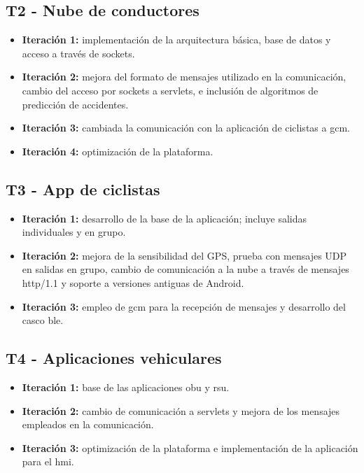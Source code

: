 \subsection{T2 - Nube de conductores}
\begin{itemize}
	\item \textbf{Iteración 1:} implementación de la arquitectura básica, base de
	datos y acceso a través de sockets.

	\item \textbf{Iteración 2:} mejora del formato de mensajes utilizado en la
	comunicación, cambio del acceso por	sockets a servlets, e inclusión de
	algoritmos de predicción de accidentes.

	\item \textbf{Iteración 3:} cambiada la comunicación con la aplicación de
	ciclistas a \gls{gcm}.

	\item \textbf{Iteración 4:} optimización de la plataforma.
\end{itemize}

\subsection{T3 - App de ciclistas}
\begin{itemize}
	\item \textbf{Iteración 1:} desarrollo de la base de la aplicación; incluye
	salidas individuales y en grupo.

	\item \textbf{Iteración 2:} mejora de la sensibilidad del GPS, prueba con
	mensajes UDP en salidas en grupo, cambio de comunicación a la nube a través
	de mensajes \Gls{http/1.1} y soporte a versiones antiguas de Android.

	\item \textbf{Iteración 3:} empleo de \gls{gcm} para la recepción de mensajes
	y desarrollo del casco \gls{ble}.
\end{itemize}

\subsection{T4 - Aplicaciones vehiculares}
\begin{itemize}
	\item \textbf{Iteración 1:} base de las aplicaciones \gls{obu} y \gls{rsu}.

	\item \textbf{Iteración 2:} cambio de comunicación a servlets y mejora de
	los mensajes empleados en la comunicación.

	\item \textbf{Iteración 3:} optimización de la plataforma e implementación
	de la aplicación para el \gls{hmi}.
\end{itemize}

